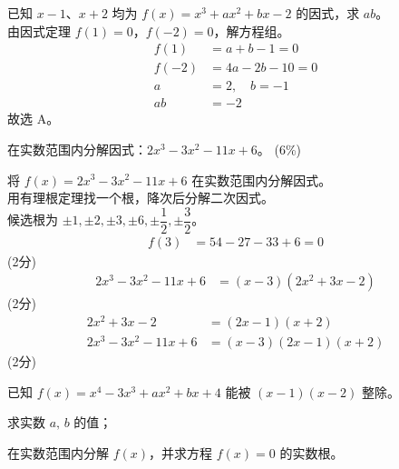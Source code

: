 \documentclass{exam-zh}
\newcommand{\qscoreoffset}{4em}
\newcommand{\qscore}[2][\%]{%
    \leavevmode\unskip\nobreak\hfill
    \makebox[0pt][l]{\makebox[\qscoreoffset][r]{(#2#1)}}%
}
\begin{document}
\begin{solution}
    已知 $x-1$、$x+2$ 均为 $f(x)=x^3+ax^2+bx-2$ 的因式，求 $ab$。 \\
    由因式定理 $f(1)=0$，$f(-2)=0$，解方程组。
    \begin{align*}
        f(1) &= a+b-1 = 0 \\
        f(-2) &= 4a-2b-10 = 0 \\
        a &= 2,\quad b=-1 \\
        ab &= -2
    \end{align*}
    故选 A。
\end{solution}

\begin{question}[points = 6]
    在实数范围内分解因式：$2x^3-3x^2-11x+6$。
    \hfill (6\%)
\end{question}

\begin{solution}
    将 $f(x)=2x^3-3x^2-11x+6$ 在实数范围内分解因式。 \\
    用有理根定理找一个根，降次后分解二次因式。 \\
    候选根为 $\pm1,\pm2,\pm3,\pm6,\pm\dfrac12,\pm\dfrac32$。
    \begin{align*}
        f(3) &= 54-27-33+6 = 0
    \end{align*}
    \hfill (2分) \\
    \begin{align*}
        2x^3-3x^2-11x+6 &= (x-3)(2x^2+3x-2)
    \end{align*}
    \hfill (2分) \\
    \begin{align*}
        2x^2+3x-2 &= (2x-1)(x+2) \\
        2x^3-3x^2-11x+6 &= (x-3)(2x-1)(x+2)
    \end{align*}
    \hfill (2分)
\end{solution}

\begin{question}[points = 8]
    已知 $f(x)=x^4-3x^3+ax^2+bx+4$ 能被 $(x-1)(x-2)$ 整除。

    \begin{questionparts}
        \item 求实数 $a,\,b$ 的值； \qscore{5}

        \item 在实数范围内分解 $f(x)$，并求方程 $f(x)=0$ 的实数根。 \qscore{3}
    \end{questionparts}
\end{question}
\end{document}
